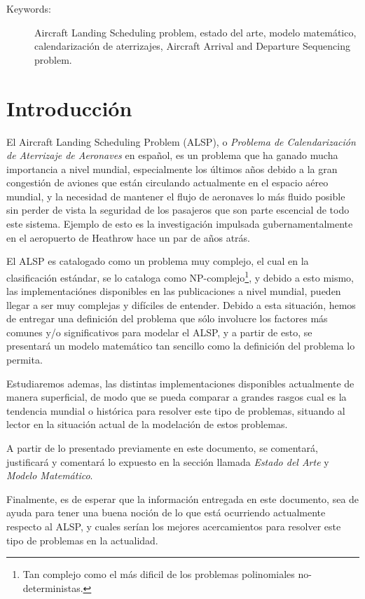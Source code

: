 \documentclass[letter, 11pt]{article}
\begin{document}
\begin{description}
\item[Keywords:] Aircraft Landing Scheduling problem, estado del arte, modelo matemático, calendarización de aterrizajes, Aircraft Arrival and Departure Sequencing problem.
\end{description}
\newpage

\section{Introducción}
El Aircraft Landing Scheduling Problem (ALSP), o \textit{Problema de Calendarización de Aterrizaje de Aeronaves} en español, es un problema que ha ganado mucha importancia a nivel mundial, especialmente los últimos años debido a la gran congestión de aviones que están circulando actualmente en el espacio aéreo mundial, y la necesidad de mantener el flujo de aeronaves lo más fluido posible sin perder de vista la seguridad de los pasajeros que son parte escencial de todo este sistema. Ejemplo de esto es la investigación impulsada gubernamentalmente en el aeropuerto de Heathrow hace un par de años atrás.

El ALSP es catalogado como un problema muy complejo, el cual en la clasificación estándar, se lo cataloga como NP-complejo\footnote{Tan complejo como el más dificil de los problemas polinomiales no-deterministas.}, y debido a esto mismo, las implementaciónes disponibles en las publicaciones a nivel mundial, pueden llegar a ser muy complejas y difíciles de entender. Debido a esta situación, hemos de entregar una definición del problema que sólo involucre los factores más comunes y/o significativos para modelar el ALSP, y a partir de esto, se presentará un modelo matemático tan sencillo como la definición del problema lo permita.

Estudiaremos ademas, las distintas implementaciones disponibles actualmente de manera superficial, de modo que se pueda comparar a grandes rasgos cual es la tendencia mundial o histórica para resolver este tipo de problemas, situando al lector en la situación actual de la modelación de estos problemas.

A partir de lo presentado previamente en este documento, se comentará, justificará y comentará lo expuesto en la sección llamada \textit{Estado del Arte} y \textit{Modelo Matemático}.

Finalmente, es de esperar que la información entregada en este documento, sea de ayuda para tener una buena noción de lo que está ocurriendo actualmente respecto al ALSP, y cuales serían los mejores acercamientos para resolver este tipo de problemas en la actualidad.
\end{document}
